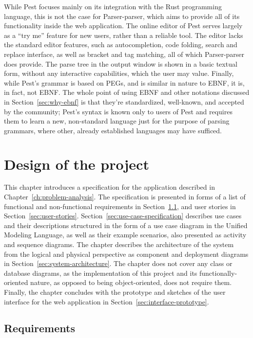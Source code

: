 \documentclass[english,bachelors,forcepolishlogotype]{wizthesis}
\newcommand{\thisproject}{Parser-parser}
\begin{document}
While Pest focuses mainly on its integration with the Rust programming language,
this is not the case for \thisproject{}, which aims to provide all of its
functionality inside the web application. The online editor of Pest serves
largely as a ``try me'' feature for new users, rather than a reliable tool. The
editor lacks the standard editor features, such as autocompletion, code folding,
search and replace interface, as well as bracket and tag matching, all of which
\thisproject{} does provide. The parse tree in the output window is shown in a
basic textual form, without any interactive capabilities, which the user may
value. Finally, while Pest's grammar is based on PEGs, and is similar in nature
to EBNF, it is, in fact, not EBNF. The whole point of using EBNF and other
notations discussed in Section~\ref{sec:why-ebnf} is that they're standardized,
well-known, and accepted by the community; Pest's syntax is known only to users
of Pest and requires them to learn a new, non-standard language just for the
purpose of parsing grammars, where other, already established languages may have
sufficed.

\chapter{Design of the project} \label{ch:design-of-the-project}

This chapter introduces a specification for the application described in
Chapter~\ref{ch:problem-analysis}. The specification is presented in forms of a
list of functional and non-functional requirements in
Section~\ref{sec:requirements}, and user stories in
Section~\ref{sec:user-stories}. Section~\ref{sec:use-case-specification}
describes use cases and their descriptions structured in the form of a use case
diagram in the Unified Modeling Language, as well as their example scenarios,
also presented as activity and sequence diagrams. The chapter describes the
architecture of the system from the logical and physical perspective as
component and deployment diagrams in Section~\ref{sec:system-architecture}. The
chapter does not cover any class or database diagrams, as the implementation of
this project and its functionally-oriented nature, as opposed to being
object-oriented, does not require them. Finally, the chapter concludes with the
prototype and sketches of the user interface for the web application in
Section~\ref{sec:interface-prototype}.

\section{Requirements} \label{sec:requirements}
\end{document}
